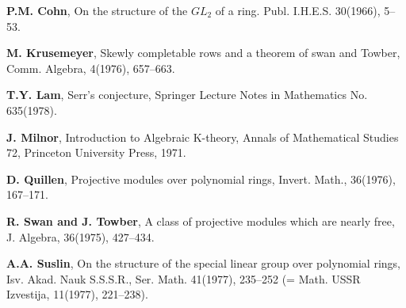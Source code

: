 \begin{thebibliography}{ABCDEFGHI}
\textbf{P.M. Cohn}, On the structure of the $GL_2$ of a
ring. Publ. I.H.E.S. 30(1966), 5--53.

\textbf{M. Krusemeyer}, Skewly completable rows and a theorem of swan and
Towber, Comm. Algebra, 4(1976), 657--663.

\textbf{T.Y. Lam}, Serr's conjecture, Springer Lecture Notes in
Mathematics No. 635(1978).

\textbf{J. Milnor}, Introduction to Algebraic K-theory, Annals of
Mathematical Studies 72, Princeton University Press, 1971.

\textbf{D. Quillen}, Projective modules over polynomial rings,
Invert. Math., 36(1976), 167--171.

\textbf{R. Swan and J. Towber}, A class of projective modules which
are nearly free, J. Algebra, 36(1975), 427--434.

\textbf{A.A. Suslin}, On the structure of the special linear group
over polynomial rings, Isv. Akad. Nauk S.S.S.R., Ser. Math. 41(1977),
235--252 (= Math. USSR Izvestija, 11(1977), 221--238).

\end{thebibliography}
